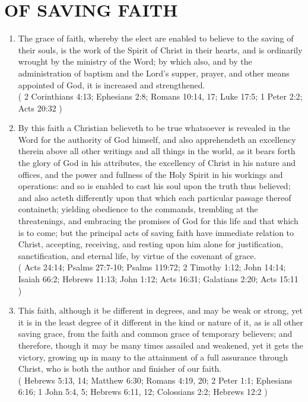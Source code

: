 \documentclass[12pt,a4paper]{book}
\begin{document}
\chapter{OF SAVING FAITH}
\label{ch-sav-fai}
\begin{enumerate}
\item
\label{ch-sav-fai-1}
The grace of faith, whereby the elect are enabled to believe to the saving of their souls, is the work of the Spirit of Christ in their hearts, and is ordinarily wrought by the ministry of the Word; by which also, and by the administration of baptism and the Lord's supper, prayer, and other means appointed of God, it is increased and strengthened.\\
( 2 Corinthians 4:13; Ephesians 2:8; Romans 10:14, 17; Luke 17:5; 1 Peter 2:2; Acts 20:32 )
\item
\label{ch-sav-fai-2}
By this faith a Christian believeth to be true whatsoever is revealed in the Word for the authority of God himself, and also apprehendeth an excellency therein above all other writings and all things in the world, as it bears forth the glory of God in his attributes, the excellency of Christ in his nature and offices, and the power and fullness of the Holy Spirit in his workings and operations: and so is enabled to cast his soul upon the truth thus believed; and also acteth differently upon that which each particular passage thereof containeth; yielding obedience to the commands, trembling at the threatenings, and embracing the promises of God for this life and that which is to come; but the principal acts of saving faith have immediate relation to Christ, accepting, receiving, and resting upon him alone for justification, sanctification, and eternal life, by virtue of the covenant of grace.\\
( Acts 24:14; Psalms 27:7-10; Psalms 119:72; 2 Timothy 1:12; John 14:14; Isaiah 66:2; Hebrews 11:13; John 1:12; Acts 16:31; Galatians 2:20; Acts 15:11 )
\item
\label{ch-sav-fai-3}
This faith, although it be different in degrees, and may be weak or strong, yet it is in the least degree of it different in the kind or nature of it, as is all other saving grace, from the faith and common grace of temporary believers; and therefore, though it may be many times assailed and weakened, yet it gets the victory, growing up in many to the attainment of a full assurance through Christ, who is both the author and finisher of our faith.\\
( Hebrews 5:13, 14; Matthew 6:30; Romans 4:19, 20; 2 Peter 1:1; Ephesians 6:16; 1 John 5:4, 5; Hebrews 6:11, 12; Colossians 2:2; Hebrews 12:2 )
\end{enumerate}
\end{document}

